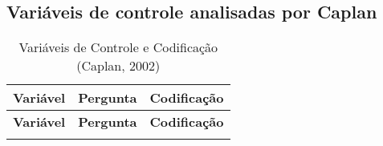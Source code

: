 
%
\begin{anexosenv}


	\chapter{Variáveis de controle analisadas por Caplan}

	\begin{longtable}{|>{\raggedright\arraybackslash}p{4cm}
        |>{\raggedright\arraybackslash}p{8cm}
        |>{\raggedright\arraybackslash}p{4cm}|}
\caption{Variáveis de Controle e Codificação (Caplan, 2002)}
\label{tab:caplan_controls} \\
\hline
\textbf{Variável} & \textbf{Pergunta} & \textbf{Codificação} \\
\hline
\endfirsthead

\hline
\textbf{Variável} & \textbf{Pergunta} & \textbf{Codificação} \\
\hline
\endhead

\hline
\endfoot

\hline
\endlastfoot


\end{longtable}
\end{anexosenv}
